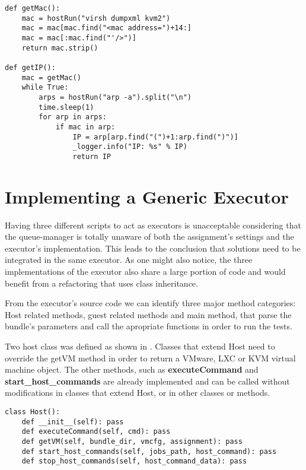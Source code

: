 \lstset{caption=Get the KVM Guest's IP, label=lst:kvm-ip}
\begin{lstlisting}
def getMac():
    mac = hostRun("virsh dumpxml kvm2")
    mac = mac[mac.find("<mac address=")+14:]
    mac = mac[:mac.find("'/>")]
    return mac.strip()
    
def getIP():
    mac = getMac()
    while True:
        arps = hostRun("arp -a").split("\n")
        time.sleep(1)
        for arp in arps:
            if mac in arp:
                IP = arp[arp.find("(")+1:arp.find(")")]
                _logger.info("IP: %s" % IP)
                return IP
\end{lstlisting}
       

\section{Implementing a Generic Executor}
\label{sec:vmc-generic}


Having three different scripts to act as executors is unacceptable considering
that the queue-manager is totally unaware of both the assignment's settings
and the executor's implementation. This leads to the conclusion that solutions
need to be integrated in the same executor. As one might also notice, the
three implementations of the executor also share a large portion of code and
would benefit from a refactoring that uses class inheritance.

From the executor's source code we can identify three major method categories:
Host related methods, guest related methods and main method, that parse the
bundle's parameters and call the apropriate functions in order to run the tests.


Two host class was defined as shown in .
Classes that extend Host need to override the getVM method in order to return a
VMware, LXC or KVM virtual machine object. The other methods, such as \textbf{executeCommand}
and \textbf{start_host_commands} are already implemented and can be called
without modifications in classes that extend Host, or in other classes or methods.

\lstset{caption=Generic Host Implementation, language=python, label=lst:generic-host}
\begin{lstlisting}
class Host():
    def __init__(self): pass
    def executeCommand(self, cmd): pass
    def getVM(self, bundle_dir, vmcfg, assignment): pass
    def start_host_commands(self, jobs_path, host_command): pass
    def stop_host_commands(self, host_command_data): pass
\end{lstlisting}


